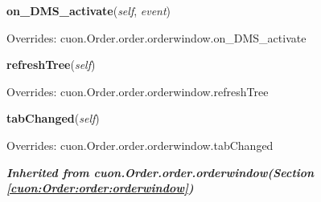     \vspace{0.5ex}

\hspace{.8\funcindent}\begin{boxedminipage}{\funcwidth}

    \raggedright \textbf{on\_DMS\_activate}(\textit{self}, \textit{event})

\setlength{\parskip}{2ex}
\setlength{\parskip}{1ex}
      Overrides: cuon.Order.order.orderwindow.on\_DMS\_activate

    \end{boxedminipage}

    \vspace{0.5ex}

\hspace{.8\funcindent}\begin{boxedminipage}{\funcwidth}

    \raggedright \textbf{refreshTree}(\textit{self})

\setlength{\parskip}{2ex}
\setlength{\parskip}{1ex}
      Overrides: cuon.Order.order.orderwindow.refreshTree

    \end{boxedminipage}

    \vspace{0.5ex}

\hspace{.8\funcindent}\begin{boxedminipage}{\funcwidth}

    \raggedright \textbf{tabChanged}(\textit{self})

\setlength{\parskip}{2ex}
\setlength{\parskip}{1ex}
      Overrides: cuon.Order.order.orderwindow.tabChanged

    \end{boxedminipage}


\large{\textbf{\textit{Inherited from cuon.Order.order.orderwindow\textit{(Section \ref{cuon:Order:order:orderwindow})}}}}

